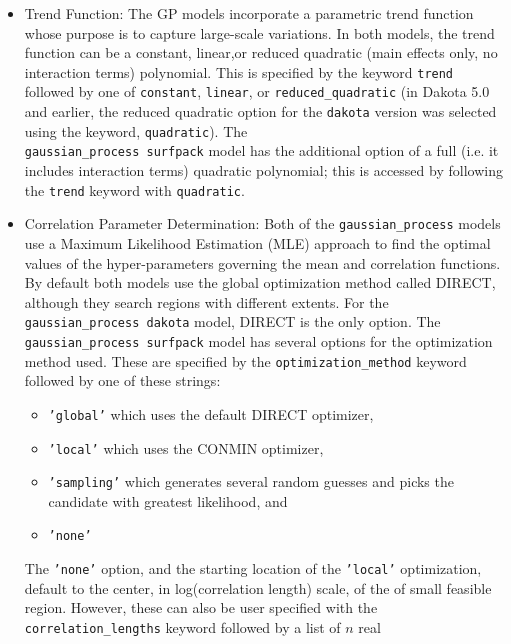 \begin{itemize}
\item Trend Function:  The GP models incorporate a parametric trend 
      function whose purpose is to capture large-scale variations. In 
      both models, the trend function can be a constant, linear,or 
      reduced quadratic (main effects only, no interaction terms) 
      polynomial.  This is specified by the keyword \texttt{trend}
      followed by one of \texttt{constant}, \texttt{linear}, or 
      \texttt{reduced\_quadratic} (in Dakota 5.0 and earlier, the reduced 
      quadratic option for the \texttt{dakota} version was selected using 
      the keyword, \texttt{quadratic}). The \\
      \texttt{gaussian\_process surfpack} model has the additional option 
      of a full (i.e. it includes interaction terms) quadratic polynomial; 
      this is accessed by following the \texttt{trend} keyword with 
      \texttt{quadratic}.
\item Correlation Parameter Determination: Both of the 
      \texttt{gaussian\_process} models use a Maximum Likelihood Estimation 
      (MLE) approach to find the optimal values of the hyper-parameters 
      governing the mean and correlation functions. By default both models 
      use the global optimization method called DIRECT, although they search 
      regions with different extents. For the 
      \texttt{gaussian\_process dakota} model, DIRECT is the only option.  
      The \texttt{gaussian\_process surfpack} model has several options for 
      the optimization method used.  These are specified by the 
      \texttt{optimization\_method} keyword followed by one of these strings:
      \begin{itemize}
      \item \texttt{'global'} which uses the default DIRECT optimizer,
      \item \texttt{'local'} which uses the CONMIN optimizer,
      \item \texttt{'sampling'} which generates several random guesses and 
            picks the candidate with greatest likelihood, and
      \item \texttt{'none'} 
      \end{itemize} 
      The \texttt{'none'} option, and the starting location of the 
      \texttt{'local'} optimization, default to the center, in 
      log(correlation length) scale, of the of small feasible region.  
      However, these can also be user specified with the 
      \texttt{correlation\_lengths} keyword followed by a list of $n$ real 

\end{itemize}
